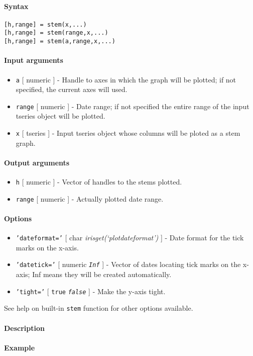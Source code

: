 


	\paragraph{Syntax}

\begin{verbatim}
[h,range] = stem(x,...)
[h,range] = stem(range,x,...)
[h,range] = stem(a,range,x,...)
\end{verbatim}

\paragraph{Input arguments}

\begin{itemize}
\item
  \texttt{a} {[} numeric {]} - Handle to axes in which the graph will be
  plotted; if not specified, the current axes will used.
\item
  \texttt{range} {[} numeric {]} - Date range; if not specified the
  entire range of the input tseries object will be plotted.
\item
  \texttt{x} {[} tseries {]} - Input tseries object whose columns will
  be ploted as a stem graph.
\end{itemize}

\paragraph{Output arguments}

\begin{itemize}
\item
  \texttt{h} {[} numeric {]} - Vector of handles to the stems plotted.
\item
  \texttt{range} {[} numeric {]} - Actually plotted date range.
\end{itemize}

\paragraph{Options}

\begin{itemize}
\item
  \texttt{'dateformat='} {[} char \textbar{}
  \emph{irisget(`plotdateformat')} {]} - Date format for the tick marks
  on the x-axis.
\item
  \texttt{'datetick='} {[} numeric \textbar{} \emph{\texttt{Inf}} {]} -
  Vector of dates locating tick marks on the x-axis; Inf means they will
  be created automatically.
\item
  \texttt{'tight='} {[} \texttt{true} \textbar{} \emph{\texttt{false}}
  {]} - Make the y-axis tight.
\end{itemize}

See help on built-in \texttt{stem} function for other options available.

\paragraph{Description}

\paragraph{Example}


